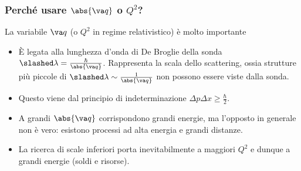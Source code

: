 \subsubsection{Perché usare $\abs{\va q}$ o $Q^2$?}
La variabile $\va q$ (o $Q^2$ in regime relativistico) è molto importante
\begin{itemize}
    \item È legata alla lunghezza d'onda di De Broglie della sonda $\slashed\lambda=\frac\hbar{\abs{\va q}}$. Rappresenta la scala dello scattering, ossia strutture più piccole di $\slashed\lambda\sim\frac1{\abs{\va q}}$ non possono essere viste dalla sonda.
    \item Questo viene dal principio di indeterminazione $\Delta p\Delta x\geq \frac\hbar2$.
    \item A grandi $\abs{\va q}$ corrispondono grandi energie, ma l'opposto in generale non è vero: esistono processi ad alta energia e grandi distanze.
    \item La ricerca di scale inferiori porta inevitabilmente a maggiori $Q^2$ e dunque a grandi energie (soldi e risorse). 
\end{itemize}
